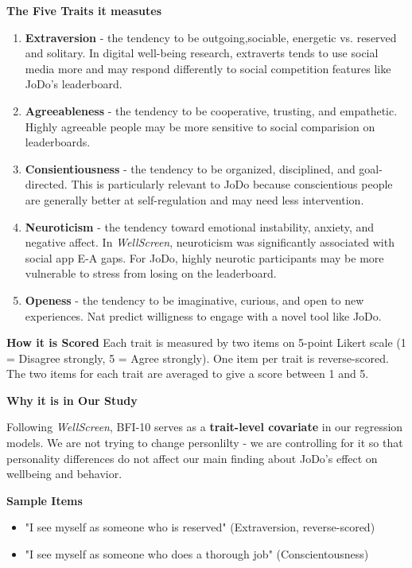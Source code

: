 \documentclass[12pt]{article}
\begin{document}
\textbf{The Five Traits it measutes}
\begin{enumerate}
    \item \textbf{Extraversion} - the tendency to be outgoing,sociable, energetic vs. reserved and solitary. In digital well-being research, extraverts tends to use social media more and may respond differently to social competition features like JoDo's leaderboard.
    \item \textbf{Agreeableness} - the tendency to be cooperative, trusting, and empathetic. Highly agreeable people may be more sensitive to social comparision on leaderboards.
    \item \textbf{Consientiousness} - the tendency to be organized, disciplined, and goal-directed. This is particularly relevant to JoDo because conscientious people are generally better at self-regulation and may need less intervention.
    \item \textbf{Neuroticism} - the tendency toward emotional instability, anxiety, and negative affect. In \textit{WellScreen}, neuroticism was significantly associated with social app E-A gaps. For JoDo, highly neurotic participants may be more vulnerable to stress from losing on the leaderboard.
    \item \textbf{Openess} - the tendency to be imaginative, curious, and open to new experiences. Nat predict willigness to engage with a novel tool like JoDo.
\end{enumerate}


\textbf{How it is Scored}
Each trait is measured by two items on 5-point Likert scale (1 = Disagree strongly, 5 = Agree strongly). One item per trait is reverse-scored. The two items for each trait are averaged to give a score between 1 and 5.


\textbf{Why it is in Our Study}


Following \textit{WellScreen}, BFI-10 serves as a \textbf{trait-level covariate} in our regression models. We are not trying to change personlilty - we are controlling for it so that personality differences do not affect our main finding about JoDo's effect on wellbeing and behavior.

\textbf{Sample Items}
\begin{itemize}
    \item "I see myself as someone who is reserved" (Extraversion, reverse-scored)
    \item "I see myself as someone who does a thorough job" (Conscientousness)
\end{itemize}
\end{document}

